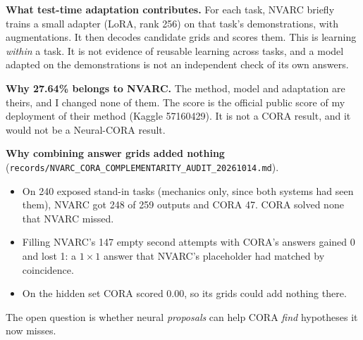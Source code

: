\documentclass[11pt]{article}
\begin{document}
\textbf{What test-time adaptation contributes.} For each task, NVARC briefly trains a small adapter (LoRA, rank 256) on
that task's demonstrations, with augmentations. It then decodes candidate grids and scores them. This is learning
\emph{within} a task. It is not evidence of reusable learning across tasks, and a model adapted on the demonstrations is
not an independent check of its own answers.

\textbf{Why 27.64\% belongs to NVARC.} The method, model and adaptation are theirs, and I changed none of them. The
score is the official public score of my deployment of their method (Kaggle 57160429). It is not a CORA result, and it
would not be a Neural-CORA result.

\textbf{Why combining answer grids added nothing}
(\texttt{records/NVARC\_CORA\_COMPLEMENTARITY\_AUDIT\_20261014.md}).
\begin{itemize}
  \item On 240 exposed stand-in tasks (mechanics only, since both systems had seen them), NVARC got 248 of 259 outputs
        and CORA 47. CORA solved none that NVARC missed.
  \item Filling NVARC's 147 empty second attempts with CORA's answers gained 0 and lost 1: a $1\times1$ answer that
        NVARC's placeholder had matched by coincidence.
  \item On the hidden set CORA scored 0.00, so its grids could add nothing there.
\end{itemize}
The open question is whether neural \emph{proposals} can help CORA \emph{find} hypotheses it now misses.
\end{document}
